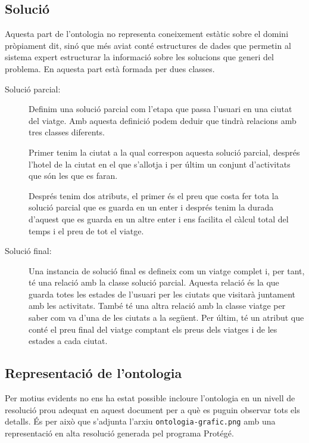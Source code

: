 \documentclass[11pt,a4paper]{article}
\begin{document}
\subsection{Solució}
Aquesta part de l'ontologia no representa coneixement estàtic sobre el domini pròpiament dit, sinó que més aviat conté estructures de dades que permetin al sistema expert estructurar la informació sobre les solucions que generi del problema. En aquesta part està formada per dues classes.

\begin{description}
\item[Solució parcial:] Definim una solució parcial com l'etapa que passa l'usuari en una ciutat del viatge. Amb aquesta definició podem deduir que tindrà relacions amb tres classes diferents.

Primer tenim la ciutat a la qual correspon aquesta solució parcial, després l'hotel de la ciutat en el que s'allotja i per últim un conjunt d'activitats que són les que es faran.

Després tenim dos atributs, el primer és el preu que costa fer tota la solució parcial que es guarda en un enter i després tenim la durada d'aquest que es guarda en un altre enter i ens facilita el càlcul total del temps i el preu de tot el viatge.

\item[Solució final:] Una instancia de solució final es defineix com un viatge complet i, per tant, té una relació amb la classe solució parcial. Aquesta relació és la que guarda totes les estades de l'usuari per les ciutats que visitarà juntament amb les activitats. També té una altra relació amb la classe viatge per saber com va d'una de les ciutats a la següent. Per últim, té un atribut que conté el preu final del viatge comptant els preus dels viatges i de les estades a cada ciutat.

\end{description}

\clearpage

\subsection{Representació de l'ontologia}
Per motius evidents no ens ha estat possible incloure l'ontologia en un nivell de resolució prou adequat en aquest document per a què es puguin observar tots els detalls. És per això que s'adjunta l'arxiu \texttt{ontologia-grafic.png} amb una representació en alta resolució generada pel programa Protégé.
\end{document}
